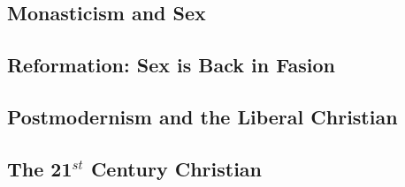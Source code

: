 \documentclass{article}
\begin{document}
\subsection{Monasticism and Sex}
\subsection{Reformation: Sex is Back in Fasion}
\subsection{Postmodernism and the Liberal Christian}
\subsection{The 21$^{st}$ Century Christian}

  

\end{document}
